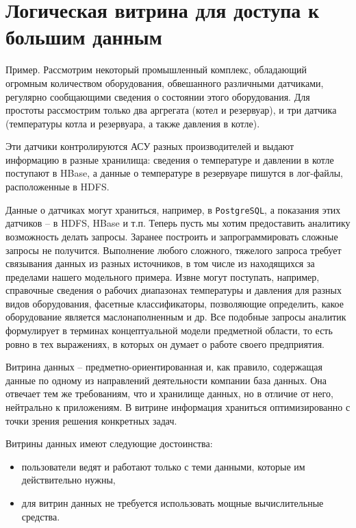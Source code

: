 \documentclass[%
	11pt,
	a4paper,
	utf8,
		]{article}
\begin{document}
\section{Логическая витрина для доступа к большим данным}

Пример. Рассмотрим некоторый промышленный комплекс, обладающий огромным количеством оборудования, обвешанного различными датчиками, регулярно сообщающими сведения о состоянии этого оборудования. Для простоты рассмострим только два аргрегата (котел и резервуар), и три датчика (температуры котла и резервуара, а также давления в котле).

Эти датчики контролируются АСУ разных производителей и выдают информацию в разные хранилища: сведения о температуре и давлении в котле поступают в HBase, а данные о температуре в резервуаре пишутся в лог-файлы, расположенные в HDFS.

Данные о датчиках могут храниться, например, в \texttt{PostgreSQL}, а показания этих датчиков -- в HDFS, HBase и т.п. Теперь пусть мы хотим предоставить аналитику возможность делать запросы. Заранее построить и запрограммировать сложные запросы не получится. Выполнение любого сложного, тяжелого запроса требует связывания данных из разных источников, в том числе из находящихся за пределами нашего модельного примера. Извне могут поступать, например, справочные сведения о рабочих диапазонах температуры и давления для разных видов оборудования, фасетные классификаторы, позволяющие определить, какое оборудование является маслонаполненным и др. Все подобные запросы аналитик формулирует в терминах концептуальной модели предметной области, то есть ровно в тех выражениях, в которых он думает о работе своего предприятия.

Витрина данных -- предметно-ориентированная и, как правило, содержащая данные по одному из направлений деятельности компании база данных. Она отвечает тем же требованиям, что и хранилище данных, но в отличие от него, нейтрально к приложениям. В витрине информация храниться оптимизированно с точки зрения решения конкретных задач.

Витрины данных имеют следующие достоинства:
\begin{itemize}
	\item пользователи ведят и работают только с теми данными, которые им действительно нужны,
	
	\item для витрин данных не требуется использовать мощные вычислительные средства.
\end{itemize}
\end{document}
